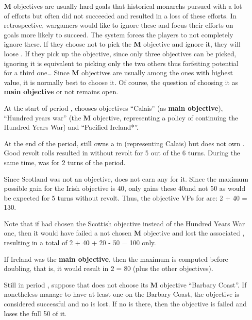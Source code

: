 \begin{designnote}
  {\bf M} objectives are usually hard goals that historical monarchs
  pursued with a lot of efforts but often did not succeeded and resulted
  in a loss of these efforts. In retrospective, wargamers would like to
  ignore these and focus their efforts on goals more likely to
  succeed. The system forces the players to not completely ignore
  these. If they choose not to pick the {\bf M} objective and ignore it,
  they will loose \VPs. If they pick up the objective, since only three
  objectives can be picked, ignoring it is equivalent to picking only
  the two others thus forfeiting potential \VPs for a third one\ldots
  Since {\bf M} objectives are usually among the ones with highest \VPs
  value, it is normally best to choose it. Of course, the question of
  choosing it as \textbf{main objective} or not remains open.
\end{designnote}

\begin{exemple}
  At the start of period , \ANG chooses objectives ``Calais''
  (as \textbf{main objective}), ``Hundred years war'' (the {\bf M}
  objective, representing a policy of continuing the Hundred Years War)
  and ``Pacified Ireland*''.

  At the end of the period, \ANG still owns a \Presidio in \provincePicardie
  (representing Calais) but does not own \provinceGuyenne. Good revolt rolls
  resulted in \regionIrlande without revolt for 5 out of the 6 turns. During
  the same time, \paysEcosse was \VASSAL for 2 turns of the period.

  Since Scotland was not an objective, \ANG does not earn any \VP for
  it. Since the maximum possible gain for the Irish objective is 40\VPs, \ANG
  only gains these 40\VPs and not 50 as would be expected for 5 turns without
  revolt. Thus, the objective VPs for \ANG are: 2  + 40 =
  130\VPs.

  Note that if \ANG had chosen the Scottish objective instead of the
  Hundred Years War one, then it would have failed a not chosen {\bf
    M} objective and lost the associated \VPs, resulting in a total of
  2  + 40 + 20 - 50 = 100 \VPs only.

  If Ireland was the \textbf{main objective}, then the maximum is computed
  before doubling, that is, it would result in 2  = 80
  \VPs (plus the other objectives).
\end{exemple}

\begin{exemple}
  Still in period , suppose that \HIS does not choose its {\bf M}
  objective ``Barbary Coast''. If \HIS nonetheless manage to have at least one
  \Presidio on the Barbary Coast, the objective is considered successful and
  no \VP is lost. If no \Presidio is there, then the objective is failed and
  \HIS loses the full 50 \VPs of it.
\end{exemple}

